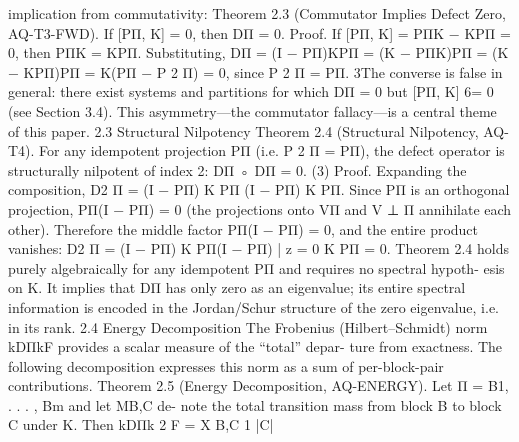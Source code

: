 implication from commutativity:
Theorem 2.3 (Commutator Implies Defect Zero, AQ-T3-FWD). If [PΠ, K] = 0, then DΠ = 0.
Proof. If [PΠ, K] = PΠK − KPΠ = 0, then PΠK = KPΠ. Substituting,
DΠ = (I − PΠ)KPΠ = (K − PΠK)PΠ = (K − KPΠ)PΠ = K(PΠ − P
2
Π) = 0,
since P
2
Π = PΠ.
3The converse is false in general: there exist systems and partitions for which DΠ = 0 but
[PΠ, K] 6= 0 (see Section 3.4). This asymmetry—the commutator fallacy—is a central theme of this
paper.
2.3 Structural Nilpotency
Theorem 2.4 (Structural Nilpotency, AQ-T4). For any idempotent projection PΠ (i.e. P
2
Π = PΠ),
the defect operator is structurally nilpotent of index 2:
DΠ ◦ DΠ = 0. (3)
Proof. Expanding the composition,
D2
Π = (I − PΠ) K PΠ (I − PΠ) K PΠ.
Since PΠ is an orthogonal projection, PΠ(I − PΠ) = 0 (the projections onto VΠ and V
⊥
Π
annihilate
each other). Therefore the middle factor PΠ(I − PΠ) = 0, and the entire product vanishes:
D2
Π = (I − PΠ) K PΠ(I − PΠ)
| {z }
= 0
K PΠ = 0.
Theorem 2.4 holds purely algebraically for any idempotent PΠ and requires no spectral hypoth-
esis on K. It implies that DΠ has only zero as an eigenvalue; its entire spectral information is
encoded in the Jordan/Schur structure of the zero eigenvalue, i.e. in its rank.
2.4 Energy Decomposition
The Frobenius (Hilbert–Schmidt) norm kDΠkF provides a scalar measure of the “total” depar-
ture from exactness. The following decomposition expresses this norm as a sum of per-block-pair
contributions.
Theorem 2.5 (Energy Decomposition, AQ-ENERGY). Let Π = {B1, . . . , Bm} and let MB,C de-
note the total transition mass from block B to block C under K. Then
kDΠk
2
F =
X
B,C
1
|C|
 
